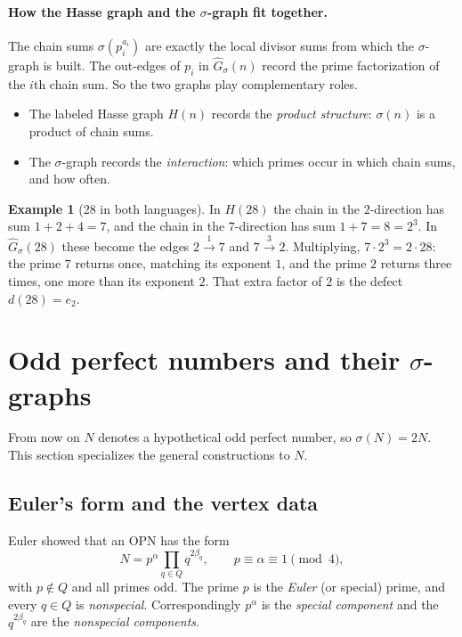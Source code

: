 \documentclass[11pt]{article}
\theoremstyle{definition}
\newtheorem{example}[theorem]{Example}
\theoremstyle{remark}
\begin{document}
\paragraph{How the Hasse graph and the $\sigma$-graph fit together.}
The chain sums $\sigma(p_i^{a_i})$ are exactly the local divisor sums from
which the $\sigma$-graph is built.  The out-edges of $p_i$ in
$\widehat G_\sigma(n)$ record the prime factorization of the $i$th chain
sum.  So the two graphs play complementary roles.
\begin{itemize}[leftmargin=1.5em]
\item The labeled Hasse graph $H(n)$ records the \emph{product structure}:
  $\sigma(n)$ is a product of chain sums.
\item The $\sigma$-graph records the \emph{interaction}: which primes occur
  in which chain sums, and how often.
\end{itemize}

\begin{example}[$28$ in both languages]\label{ex:28both}
In $H(28)$ the chain in the $2$-direction has sum $1+2+4=7$, and the chain
in the $7$-direction has sum $1+7=8=2^3$.  In $\widehat G_\sigma(28)$ these
become the edges $2\xrightarrow{1}7$ and $7\xrightarrow{3}2$.  Multiplying,
$7\cdot2^3=2\cdot28$: the prime $7$ returns once, matching its exponent
$1$, and the prime $2$ returns three times, one more than its exponent $2$.
That extra factor of $2$ is the defect $d(28)=e_2$.
\end{example}

\section{Odd perfect numbers and their $\sigma$-graphs}\label{sec:opn}

From now on $N$ denotes a hypothetical odd perfect number, so
$\sigma(N)=2N$.  This section specializes the general constructions to $N$.

\subsection{Euler's form and the vertex data}\label{sec:notation}

Euler showed that an OPN has the form
\[
N=p^{\alpha}\prod_{q\in Q}q^{2\beta_q},\qquad
p\equiv\alpha\equiv 1\pmod 4,
\]
with $p\notin Q$ and all primes odd.  The prime $p$ is the \emph{Euler} (or
special) prime, and every $q\in Q$ is \emph{nonspecial}.  Correspondingly
$p^\alpha$ is the \emph{special component} and the $q^{2\beta_q}$ are the
\emph{nonspecial components}.
\end{document}
